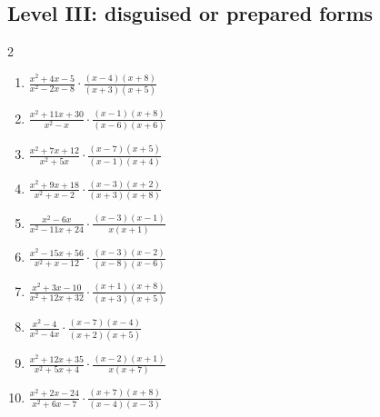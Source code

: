 \documentclass[11pt,oneside]{book}
\begin{document}
\subsection*{Level III: disguised or prepared forms}
\begin{multicols}{2}
\begin{enumerate}[leftmargin=*,label=\textbf{\arabic*.},itemsep=0.65\baselineskip]
\item $\displaystyle \frac{x^{2} + 4 x - 5}{x^{2} - 2 x - 8}\cdot\frac{\left(x - 4\right) \left(x + 8\right)}{\left(x + 3\right) \left(x + 5\right)}$
\item $\displaystyle \frac{x^{2} + 11 x + 30}{x^{2} - x}\cdot\frac{\left(x - 1\right) \left(x + 8\right)}{\left(x - 6\right) \left(x + 6\right)}$
\item $\displaystyle \frac{x^{2} + 7 x + 12}{x^{2} + 5 x}\cdot\frac{\left(x - 7\right) \left(x + 5\right)}{\left(x - 1\right) \left(x + 4\right)}$
\item $\displaystyle \frac{x^{2} + 9 x + 18}{x^{2} + x - 2}\cdot\frac{\left(x - 3\right) \left(x + 2\right)}{\left(x + 3\right) \left(x + 8\right)}$
\item $\displaystyle \frac{x^{2} - 6 x}{x^{2} - 11 x + 24}\cdot\frac{\left(x - 3\right) \left(x - 1\right)}{x \left(x + 1\right)}$
\item $\displaystyle \frac{x^{2} - 15 x + 56}{x^{2} + x - 12}\cdot\frac{\left(x - 3\right) \left(x - 2\right)}{\left(x - 8\right) \left(x - 6\right)}$
\item $\displaystyle \frac{x^{2} + 3 x - 10}{x^{2} + 12 x + 32}\cdot\frac{\left(x + 1\right) \left(x + 8\right)}{\left(x + 3\right) \left(x + 5\right)}$
\item $\displaystyle \frac{x^{2} - 4}{x^{2} - 4 x}\cdot\frac{\left(x - 7\right) \left(x - 4\right)}{\left(x + 2\right) \left(x + 5\right)}$
\item $\displaystyle \frac{x^{2} + 12 x + 35}{x^{2} + 5 x + 4}\cdot\frac{\left(x - 2\right) \left(x + 1\right)}{x \left(x + 7\right)}$
\item $\displaystyle \frac{x^{2} + 2 x - 24}{x^{2} + 6 x - 7}\cdot\frac{\left(x + 7\right) \left(x + 8\right)}{\left(x - 4\right) \left(x - 3\right)}$
\end{enumerate}
\end{multicols}
\end{document}
